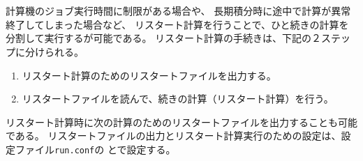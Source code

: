 \section{\SecAdvanceRestart}\label{sec:restart}

計算機のジョブ実行時間に制限がある場合や、
長期積分時に途中で計算が異常終了してしまった場合など、
リスタート計算を行うことで、ひと続きの計算を分割して実行するが可能である。
リスタート計算の手続きは、下記の２ステップに分けられる。
\begin{enumerate}
\item リスタート計算のためのリスタートファイルを出力する。
\item リスタートファイルを読んで、続きの計算（リスタート計算）を行う。
\end{enumerate}
リスタート計算時に次の計算のためのリスタートファイルを出力することも可能である。
リスタートファイルの出力とリスタート計算実行のための設定は、設定ファイル\verb|run.conf|の
とで設定する。\\

